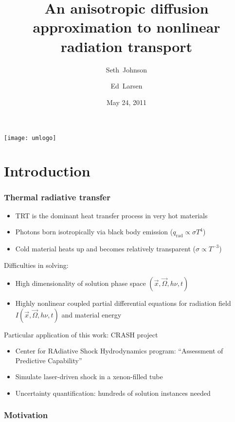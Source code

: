 \documentclass{beamer}
\title[KAPL Seminar]%
{An anisotropic diffusion approximation to nonlinear radiation transport}
\author[SRJ, EWL]{Seth~Johnson \and Ed~Larsen}
\institute[UMich]{
University of Michigan, Ann Arbor
}
\date[5/24/2011]{May 24, 2011}
\begin{document}

\begin{frame}
\titlepage
\begin{center}
  \texttt{[image: umlogo]}
\end{center}
\end{frame}

\section{Introduction}
\begin{frame}
  \frametitle{Thermal radiative transfer}
  \begin{itemize}
    \item TRT is the dominant heat transfer process in very hot materials
    \item Photons born isotropically via black body emission
      ($q_\text{rad} \propto \sigma T^4$)
    \item Cold material heats up and becomes relatively transparent
      ($\sigma\propto T^{-3}$)
  \end{itemize}

  Difficulties in solving:
  \begin{itemize}
    \item High dimensionality of solution phase space $(\vec{x}, \vec{\Omega},
      h\nu, t)$
    \item Highly nonlinear coupled partial differential equations for radiation
      field $I(\vec{x}, \vec{\Omega}, h\nu, t)$ and material energy
  \end{itemize}

  Particular application of this work: CRASH project
  \begin{itemize}
    \item Center for RAdiative Shock Hydrodynamics program: ``Assessment
      of Predictive Capability''
    \item Simulate laser-driven shock in a xenon-filled tube
    \item Uncertainty quantification: hundreds of solution instances needed
  \end{itemize}
\end{frame}

\begin{frame}
  \frametitle{Motivation}

  \centering

\end{frame}
\end{document}
